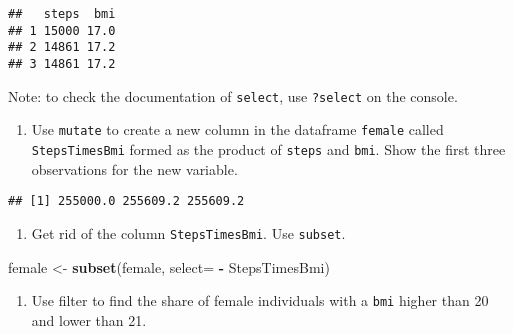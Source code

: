 \documentclass[
]{book}
\newenvironment{Shaded}{\begin{snugshade}}{\end{snugshade}}
\newcommand{\AttributeTok}[1]{\textcolor[rgb]{0.13,0.29,0.53}{#1}}
\newcommand{\DecValTok}[1]{\textcolor[rgb]{0.00,0.00,0.81}{#1}}
\newcommand{\FunctionTok}[1]{\textcolor[rgb]{0.13,0.29,0.53}{\textbf{#1}}}
\newcommand{\NormalTok}[1]{#1}
\newcommand{\OtherTok}[1]{\textcolor[rgb]{0.56,0.35,0.01}{#1}}
\newcommand{\SpecialCharTok}[1]{\textcolor[rgb]{0.81,0.36,0.00}{\textbf{#1}}}
\providecommand{\tightlist}{%
  \setlength{\itemsep}{0pt}\setlength{\parskip}{0pt}}
\begin{document}
\begin{verbatim}
##   steps  bmi
## 1 15000 17.0
## 2 14861 17.2
## 3 14861 17.2
\end{verbatim}

Note: to check the documentation of \texttt{select}, use \texttt{?select} on the console.

\begin{enumerate}
\def\labelenumi{\arabic{enumi}.}
\setcounter{enumi}{3}
\tightlist
\item
  Use \texttt{mutate} to create a new column in the dataframe \texttt{female} called \texttt{StepsTimesBmi} formed as the product of \texttt{steps} and \texttt{bmi}. Show the first three observations for the new variable.
\end{enumerate}

\begin{Shaded}
\end{Shaded}

\begin{verbatim}
## [1] 255000.0 255609.2 255609.2
\end{verbatim}

\begin{enumerate}
\def\labelenumi{\arabic{enumi}.}
\setcounter{enumi}{4}
\tightlist
\item
  Get rid of the column \texttt{StepsTimesBmi}. Use \texttt{subset}.
\end{enumerate}

\begin{Shaded}
\begin{Highlighting}[]
\NormalTok{female }\OtherTok{\textless{}{-}} \FunctionTok{subset}\NormalTok{(female, }\AttributeTok{select=} \SpecialCharTok{{-}}\NormalTok{ StepsTimesBmi)}
\end{Highlighting}
\end{Shaded}

\begin{enumerate}
\def\labelenumi{\arabic{enumi}.}
\setcounter{enumi}{5}
\tightlist
\item
  Use filter to find the share of female individuals with a \texttt{bmi} higher than 20 and lower than 21.
\end{enumerate}
\end{document}
